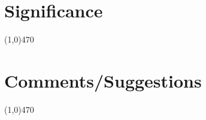 \documentclass[12pt]{article}
\begin{document}
	\newpage
\section{Significance} \vspace{-.7cm} \line(1,0){470}
	\paragraph{} 


 \section{Comments/Suggestions}\vspace{-.7cm} \line(1,0){470}
 	\paragraph{} 
		
\end{document}
